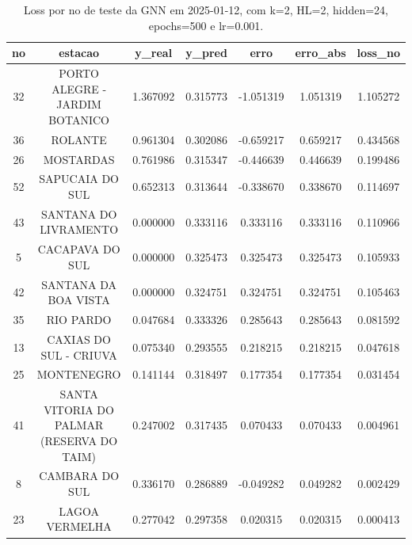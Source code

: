 \begin{table}[h]
\centering
\caption{Loss por no de teste da GNN em 2025-01-12, com k=2, HL=2, hidden=24, epochs=500 e lr=0.001.}
\label{tab:gnn_loss_k2_hl2_h24_e500_d20250112}
\begin{tabular}{ccccccc}
\toprule
no & estacao & y\_real & y\_pred & erro & erro\_abs & loss\_no \\
\midrule
32 & PORTO ALEGRE - JARDIM BOTANICO & 1.367092 & 0.315773 & -1.051319 & 1.051319 & 1.105272 \\
36 & ROLANTE & 0.961304 & 0.302086 & -0.659217 & 0.659217 & 0.434568 \\
26 & MOSTARDAS & 0.761986 & 0.315347 & -0.446639 & 0.446639 & 0.199486 \\
52 & SAPUCAIA DO SUL & 0.652313 & 0.313644 & -0.338670 & 0.338670 & 0.114697 \\
43 & SANTANA DO LIVRAMENTO & 0.000000 & 0.333116 & 0.333116 & 0.333116 & 0.110966 \\
5 & CACAPAVA DO SUL & 0.000000 & 0.325473 & 0.325473 & 0.325473 & 0.105933 \\
42 & SANTANA DA BOA VISTA & 0.000000 & 0.324751 & 0.324751 & 0.324751 & 0.105463 \\
35 & RIO PARDO & 0.047684 & 0.333326 & 0.285643 & 0.285643 & 0.081592 \\
13 & CAXIAS DO SUL - CRIUVA & 0.075340 & 0.293555 & 0.218215 & 0.218215 & 0.047618 \\
25 & MONTENEGRO & 0.141144 & 0.318497 & 0.177354 & 0.177354 & 0.031454 \\
41 & SANTA VITORIA DO PALMAR (RESERVA DO TAIM) & 0.247002 & 0.317435 & 0.070433 & 0.070433 & 0.004961 \\
8 & CAMBARA DO SUL & 0.336170 & 0.286889 & -0.049282 & 0.049282 & 0.002429 \\
23 & LAGOA VERMELHA & 0.277042 & 0.297358 & 0.020315 & 0.020315 & 0.000413 \\
\bottomrule
\end{tabular}
\end{table}
